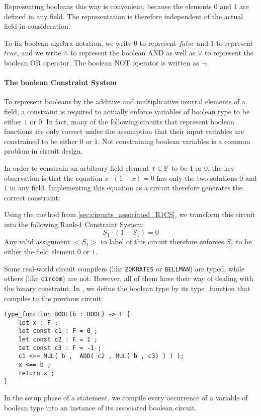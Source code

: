 Representing booleans this way is convenient, because the elements $0$ and $1$ are defined in any field. The representation is therefore independent of the actual field in consideration. 

To fix boolean algebra notation, we write $0$ to represent $false$ and $1$ to represent $true$, and we write $\wedge$ to represent the boolean AND as well as $\vee$ to represent the boolean OR operator. The boolean NOT operator is written as $\lnot$. 
\paragraph{The boolean Constraint System}
\label{def:boolean_constraint} To represent booleans by the additive and multiplicative neutral elements of a field, a constraint is required to actually enforce variables of boolean type to be either $1$ or $0$. In fact, many of the following circuits that represent boolean functions are only correct under the assumption that their input variables are constrained to be either $0$ or $1$. Not constraining boolean variables is a common problem in circuit design.

In order to constrain an arbitrary field element $x\in \mathbb{F}$ to be $1$ or $0$, the key observation is that the equation $x \cdot (1-x) =0$ has only the two solutions $0$ and $1$ in any field. Implementing this equation as a circuit therefore generates the correct constraint:
\begin{center}
\end{center}
Using the method from \ref{sec:circuits_associated_R1CS}, we transform this circuit into the following Rank-1 Constraint System:
$$
S_1 \cdot (1-S_1) = 0
$$
Any valid assignment $<S_1>$ to label of this circuit therefore enforces $S_1$ to be either the field element $0$ or $1$. 

Some real-world circuit compilers (like \texttt{ZOKRATES} or \texttt{BELLMAN}) are typed, while others (like \texttt{circom}) are not. However, all of them have their way of dealing with the binary constraint. In , we define the boolean type by its type\_function that compiles to the previous circuit:
\begin{lstlisting}
type_function BOOL(b : BOOL) -> F { 
	let x : F ;
	let const c1 : F = 0 ;
	let const c2 : F = 1 ;
	tet const c3 : F = -1 ;
    c1 <== MUL( b ,  ADD( c2 , MUL( b , c3) ) ) );
    x <== b ;
    return x ;
}
\end{lstlisting}
In the setup phase of a statement, we compile every occurrence of a variable of boolean type into an instance of its associated boolean circuit.

